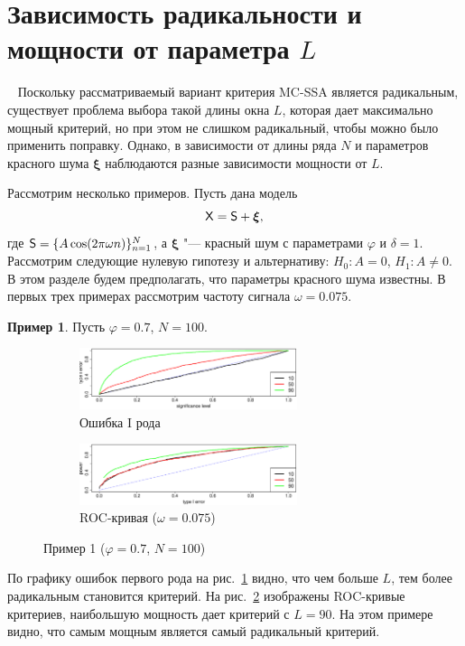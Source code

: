 \documentclass[specialist,
substylefile = spbu_report.rtx,
subf,href,colorlinks=true, 12pt]{disser}
\theoremstyle{definition}
\newtheorem{example}{Пример}
\newcommand{\bfxi}{\boldsymbol{\xi}}
\begin{document}
\section{Зависимость радикальности и мощности от параметра $L$}~\label{sect:cps2024}
Поскольку рассматриваемый вариант критерия MC-SSA является радикальным, существует проблема выбора такой длины окна $L$, которая дает максимально мощный критерий, но при этом не слишком радикальный, чтобы можно было применить поправку. Однако, в зависимости от длины ряда $N$ и параметров красного шума $\bfxi$ наблюдаются разные зависимости мощности от $L$.

Рассмотрим несколько примеров. Пусть дана модель
\[
    \mathsf{X}=\mathsf{S}+{\boldsymbol\xi},
\]
где $\mathsf{S}=\{A\cos(2\pi\omega n)\}_{n=1}^N$, а ${\boldsymbol\xi}$ "--- красный шум с параметрами $\varphi$ и $\delta=1$. Рассмотрим следующие нулевую гипотезу и альтернативу: $H_0:A=0$, $H_1:A\ne0$. В этом разделе будем предполагать, что параметры красного шума известны. В первых трех примерах рассмотрим частоту сигнала $\omega = 0.075$.

\begin{example}\label{example1}
	Пусть $\varphi=0.7$, $N=100$.
	\begin{figure}[h!]
		\captionsetup[subfigure]{justification=Centering}
		\begin{subfigure}[t]{\textwidth}
			\centering
			\includegraphics[width=0.7\textwidth]{../cps2024/images/alphaI_phi7_N100.eps}
			\caption{Ошибка I рода}
			\label{alphaI_phi7_N100}
		\end{subfigure}
		\begin{subfigure}[t]{\textwidth}
			\centering
			\includegraphics[width=0.7\textwidth]{../cps2024/images/roc_phi7_N100.eps}
			\caption{ROC-кривая ($\omega=0.075$)}
			\label{roc_phi7_N100}
		\end{subfigure}
	\label{fig:example1}
	\caption{Пример 1 ($\varphi=0.7$, $N=100$)}
	\end{figure}
	По графику ошибок первого рода на рис.~\ref{alphaI_phi7_N100} видно, что чем больше $L$, тем более радикальным становится критерий. На рис.~\ref{roc_phi7_N100} изображены ROC-кривые критериев, наибольшую мощность дает критерий с $L=90$. На этом примере видно, что самым мощным является самый радикальный критерий. 
\end{example}
\end{document}
